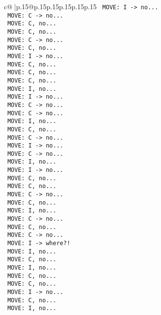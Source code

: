 \documentclass{article}
\begin{document}
{\begin{supertabular}{c@{$\;$}|p{.15\linewidth}@{}p{.15\linewidth}p{.15\linewidth}p{.15\linewidth}p{.15\linewidth}p{.15\linewidth}}
{{{\texttt{ MOVE: I {-}> no...} \\
\texttt{ MOVE: C {-}> no...} \\
\texttt{ MOVE: C, no...} \\
\texttt{ MOVE: C, no...} \\
\texttt{ MOVE: C {-}> no...} \\
\texttt{ MOVE: C, no...} \\
\texttt{ MOVE: I {-}> no...} \\
\texttt{ MOVE: C, no...} \\
\texttt{ MOVE: C, no...} \\
\texttt{ MOVE: C, no...} \\
\texttt{ MOVE: I, no...} \\
\texttt{ MOVE: I {-}> no...} \\
\texttt{ MOVE: C {-}> no...} \\
\texttt{ MOVE: C {-}> no...} \\
\texttt{ MOVE: I, no...} \\
\texttt{ MOVE: C, no...} \\
\texttt{ MOVE: C {-}> no...} \\
\texttt{ MOVE: I {-}> no...} \\
\texttt{ MOVE: C {-}> no...} \\
\texttt{ MOVE: I, no...} \\
\texttt{ MOVE: I {-}> no...} \\
\texttt{ MOVE: C, no...} \\
\texttt{ MOVE: C, no...} \\
\texttt{ MOVE: C {-}> no...} \\
\texttt{ MOVE: C, no...} \\
\texttt{ MOVE: I, no...} \\
\texttt{ MOVE: C {-}> no...} \\
\texttt{ MOVE: C, no...} \\
\texttt{ MOVE: C {-}> no...} \\
\texttt{ MOVE: I {-}> where?!} \\
\texttt{ MOVE: I, no...} \\
\texttt{ MOVE: C, no...} \\
\texttt{ MOVE: I, no...} \\
\texttt{ MOVE: C, no...} \\
\texttt{ MOVE: C, no...} \\
\texttt{ MOVE: I {-}> no...} \\
\texttt{ MOVE: C, no...} \\
\texttt{ MOVE: I, no...} \\
}}}
\end{supertabular}}
\end{document}
